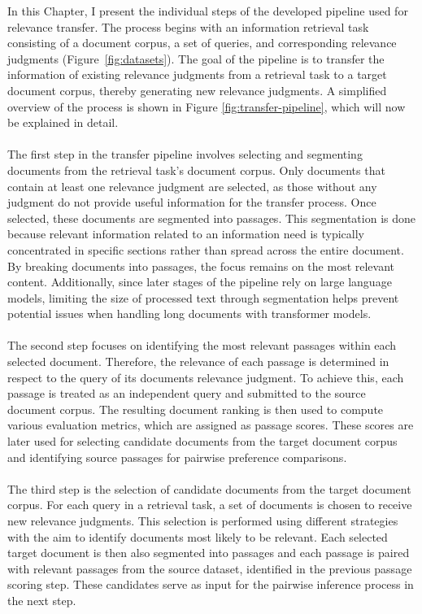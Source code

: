 In this Chapter, I present the individual steps of the developed pipeline used for relevance transfer. The process begins with an information retrieval task consisting of a document corpus, a set of queries, and corresponding relevance judgments (Figure~\ref{fig:datasets}). The goal of the pipeline is to transfer the information of existing relevance judgments from a retrieval task to a target document corpus, thereby generating new relevance judgments. A simplified overview of the process is shown in Figure \ref{fig:transfer-pipeline}, which will now be explained in detail.
\\\\
The first step in the transfer pipeline involves selecting and segmenting documents from the retrieval task's document corpus. Only documents that contain at least one relevance judgment are selected, as those without any judgment do not provide useful information for the transfer process. Once selected, these documents are segmented into passages. This segmentation is done because relevant information related to an information need is typically concentrated in specific sections rather than spread across the entire document. By breaking documents into passages, the focus remains on the most relevant content. Additionally, since later stages of the pipeline rely on large language models, limiting the size of processed text through segmentation helps prevent potential issues when handling long documents with transformer models.
\\\\
The second step focuses on identifying the most relevant passages within each selected document. Therefore, the relevance of each passage is determined in respect to the query of its documents relevance judgment. To achieve this, each passage is treated as an independent query and submitted to the source document corpus. The resulting document ranking is then used to compute various evaluation metrics, which are assigned as passage scores. These scores are later used for selecting candidate documents from the target document corpus and identifying source passages for pairwise preference comparisons.
\\\\
The third step is the selection of candidate documents from the target document corpus. For each query in a retrieval task, a set of documents is chosen to receive new relevance judgments. This selection is performed using different strategies with the aim to identify documents most likely to be relevant. Each selected target document is then also segmented into passages and each passage is paired with relevant passages from the source dataset, identified in the previous passage scoring step. These candidates serve as input for the pairwise inference process in the next step.
